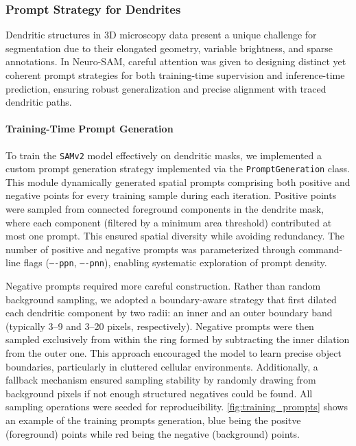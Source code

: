\subsubsection{\textbf{Prompt Strategy for Dendrites}}
Dendritic structures in 3D microscopy data present a unique challenge for segmentation due to their elongated geometry, variable brightness, and sparse annotations. In Neuro-\gls{SAM}, careful attention was given to designing distinct yet coherent prompt strategies for both training-time supervision and inference-time prediction, ensuring robust generalization and precise alignment with traced dendritic paths.


\paragraph{Training-Time Prompt Generation}

To train the \texttt{\gls{SAMv2}} model effectively on dendritic masks, we implemented a custom prompt generation strategy implemented via the \texttt{PromptGeneration} class. This module dynamically generated spatial prompts comprising both positive and negative points for every training sample during each iteration. Positive points were sampled from connected foreground components in the dendrite mask, where each component (filtered by a minimum area threshold) contributed at most one prompt. This ensured spatial diversity while avoiding redundancy. The number of positive and negative prompts was parameterized through command-line flags (\texttt{----ppn}, \texttt{----pnn}), enabling systematic exploration of prompt density.

Negative prompts required more careful construction. Rather than random background sampling, we adopted a boundary-aware strategy that first dilated each dendritic component by two radii: an inner and an outer boundary band (typically 3–9 and 3–20 pixels, respectively). Negative prompts were then sampled exclusively from within the ring formed by subtracting the inner dilation from the outer one. This approach encouraged the model to learn precise object boundaries, particularly in cluttered cellular environments. Additionally, a fallback mechanism ensured sampling stability by randomly drawing from background pixels if not enough structured negatives could be found. All sampling operations were seeded for reproducibility. \autoref{fig:training_prompts} shows an example of the training prompts generation, blue being the positve (foreground) points while red being the negative (background) points. 

